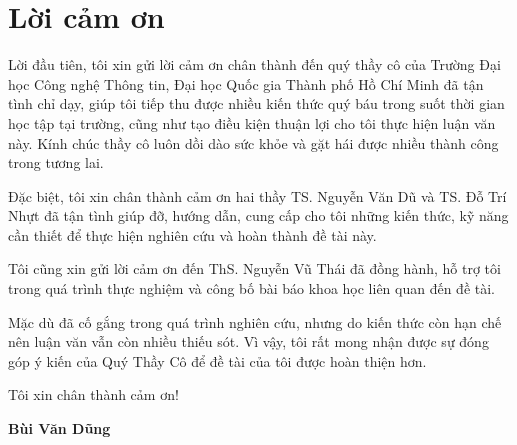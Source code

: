 \chapter*{Lời cảm ơn}

Lời đầu tiên, tôi xin gửi lời cảm ơn chân thành đến quý thầy cô của Trường Đại học Công nghệ Thông tin, Đại học Quốc gia Thành phố Hồ Chí Minh đã tận tình chỉ dạy, giúp tôi tiếp thu được nhiều kiến thức quý báu trong suốt thời gian học tập tại trường, cũng như tạo điều kiện thuận lợi cho tôi thực hiện luận văn này. Kính chúc thầy cô luôn dồi dào sức khỏe và gặt hái được nhiều thành công trong tương lai.

Đặc biệt, tôi xin chân thành cảm ơn hai thầy TS. Nguyễn Văn Dũ và TS. Đỗ Trí Nhựt đã tận tình giúp đỡ, hướng dẫn, cung cấp cho tôi những kiến thức, kỹ năng cần thiết để thực hiện nghiên cứu và hoàn thành đề tài này.

Tôi cũng xin gửi lời cảm ơn đến ThS. Nguyễn Vũ Thái đã đồng hành, hỗ trợ tôi trong quá trình thực nghiệm và công bố bài báo khoa học liên quan đến đề tài.

Mặc dù đã cố gắng trong quá trình nghiên cứu, nhưng do kiến thức còn hạn chế nên luận văn vẫn còn nhiều thiếu sót. Vì vậy, tôi rất mong nhận được sự đóng góp ý kiến của Quý Thầy Cô để đề tài của tôi được hoàn thiện hơn.

Tôi xin chân thành cảm ơn!


\begin{flushright}
\begin{minipage}{0.5\textwidth}
\centering
\textbf{Bùi Văn Dũng}
\end{minipage}
\end{flushright}